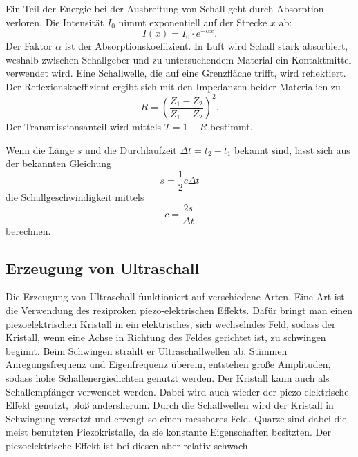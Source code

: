 \noindent Ein Teil der Energie bei der Ausbreitung von Schall geht 
durch Absorption verloren. Die Intensität $I_0$ nimmt 
exponentiell auf der Strecke $x$ ab:
\begin{equation}
    I(x)= I_0 \cdot e^{-\alpha x}.
    \label{eqn:I}
\end{equation}
Der Faktor $\alpha$ 
ist der Absorptionskoeffizient.
In Luft wird Schall stark absorbiert, weshalb zwischen 
Schallgeber und zu untersuchendem Material ein Kontaktmittel 
verwendet wird.
\newline
Eine Schallwelle, die auf eine Grenzfläche trifft, wird 
reflektiert. Der Reflexionskoeffizient ergibt sich mit den 
Impedanzen beider Materialien zu 
\begin{equation*}
    R = \left(\frac{Z_1-Z_2}{Z_1-Z_2}\right)^2. %
\end{equation*}
Der Transmissionsanteil wird mittels $T= 1-R$ bestimmt.

\noindent Wenn die Länge $s$ und die Durchlaufzeit $\Delta t = t_2 - t_1$
bekannt sind, lässt sich aus der bekannten Gleichung
\begin{equation}
    s=\frac{1}{2}c \Delta t
    \label{eqn:s}
\end{equation}
die Schallgeschwindigkeit mittels
\begin{equation}
    c = \frac{2 s}{\Delta t}
    \label{eqn:c}
\end{equation}
berechnen.

\subsection{Erzeugung von Ultraschall}
\noindent Die Erzeugung von Ultraschall funktioniert auf verschiedene 
Arten. Eine Art ist die Verwendung des reziproken 
piezo-elektrischen Effekts. Dafür bringt man einen 
piezoelektrischen Kristall in ein elektrisches, sich
wechselndes Feld, sodass der Kristall, wenn eine Achse in 
Richtung des Feldes gerichtet ist, zu 
schwingen beginnt. Beim Schwingen strahlt er Ultraschallwellen ab. 
Stimmen Anregungsfrequenz und Eigenfrequenz überein, 
entstehen große Amplituden, sodass hohe Schallenergiedichten 
genutzt werden. Der Kristall kann auch als Schallempfänger 
verwendet werden. Dabei wird auch wieder der piezo-elektrische Effekt genutzt, bloß andersherum. Durch die Schallwellen wird der Kristall in Schwingung versetzt und erzeugt so einen messbares Feld. %
Quarze sind dabei die meist benutzten 
Piezokristalle, da sie konstante Eigenschaften besitzten. 
Der piezoelektrische Effekt ist bei diesen aber relativ schwach. 

